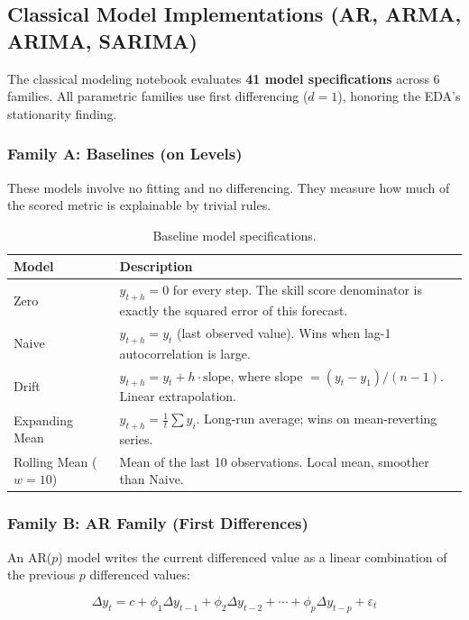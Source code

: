 \subsection{Classical Model Implementations (AR, ARMA, ARIMA, SARIMA)}
The classical modeling notebook evaluates \textbf{41 model specifications} across 6 families. All parametric families use first differencing ($d = 1$), honoring the EDA's stationarity finding.

\subsubsection{Family A: Baselines (on Levels)}

These models involve no fitting and no differencing. They measure how much of the scored metric is explainable by trivial rules.

\begin{table}[H]
\centering
\caption{Baseline model specifications.}
\begin{tabular}{lp{8cm}}
\toprule
\textbf{Model} & \textbf{Description} \\
\midrule
Zero & $\hat{y}_{t+h} = 0$ for every step. The skill score denominator is exactly the squared error of this forecast. \\
Naive & $\hat{y}_{t+h} = y_t$ (last observed value). Wins when lag-1 autocorrelation is large. \\
Drift & $\hat{y}_{t+h} = y_t + h \cdot \text{slope}$, where slope $= (y_t - y_1)/(n-1)$. Linear extrapolation. \\
Expanding Mean & $\hat{y}_{t+h} = \frac{1}{t}\sum y_i$. Long-run average; wins on mean-reverting series. \\
Rolling Mean ($w=10$) & Mean of the last 10 observations. Local mean, smoother than Naive. \\
\bottomrule
\end{tabular}
\end{table}

\subsubsection{Family B: AR Family (First Differences)}

An AR($p$) model writes the current differenced value as a linear combination of the previous $p$ differenced values:

\begin{equation}
\Delta y_t = c + \phi_1 \Delta y_{t-1} + \phi_2 \Delta y_{t-2} + \cdots + \phi_p \Delta y_{t-p} + \varepsilon_t
\end{equation}

